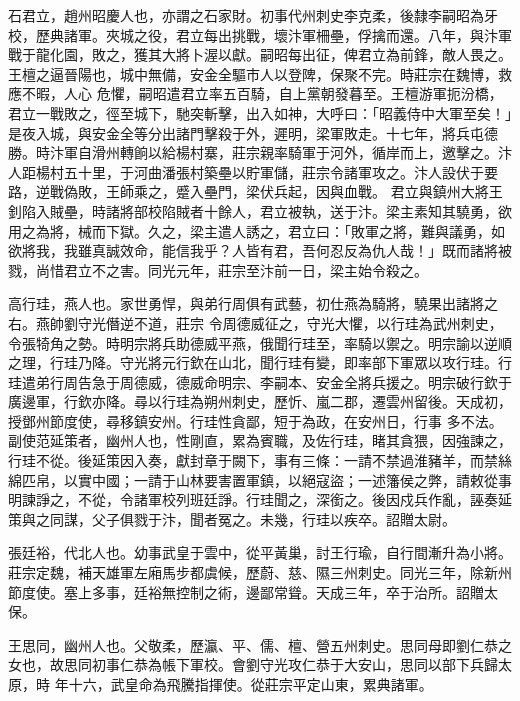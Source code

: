 \begin{pinyinscope}
 石君立，趙州昭慶人也，亦謂之石家財。初事代州刺史李克柔，後隸李嗣昭為牙校，歷典諸軍。夾城之役，君立每出挑戰，壞汴軍柵壘，俘擒而還。八年，與汴軍戰于龍化園，敗之，獲其大將卜渥以獻。嗣昭每出征，俾君立為前鋒，敵人畏之。王檀之逼晉陽也，城中無備，安金全驅市人以登陴，保聚不完。時莊宗在魏博，救應不暇，人心
 危懼，嗣昭遣君立率五百騎，自上黨朝發暮至。王檀游軍扼汾橋，君立一戰敗之，徑至城下，馳突斬擊，出入如神，大呼曰：「昭義侍中大軍至矣！」是夜入城，與安金全等分出諸門擊殺于外，遲明，梁軍敗走。十七年，將兵屯德勝。時汴軍自滑州轉餉以給楊村寨，莊宗親率騎軍于河外，循岸而上，邀擊之。汴人距楊村五十里，于河曲潘張村築壘以貯軍儲，莊宗令諸軍攻之。汴人設伏于要路，逆戰偽敗，王師乘之，蹙入壘門，梁伏兵起，因與血戰。
 君立與鎮州大將王釗陷入賊壘，時諸將部校陷賊者十餘人，君立被執，送于汴。梁主素知其驍勇，欲用之為將，械而下獄。久之，梁主遣人誘之，君立曰：「敗軍之將，難與議勇，如欲將我，我雖真誠效命，能信我乎？人皆有君，吾何忍反為仇人哉！」既而諸將被戮，尚惜君立不之害。同光元年，莊宗至汴前一日，梁主始令殺之。



 高行珪，燕人也。家世勇悍，與弟行周俱有武藝，初仕燕為騎將，驍果出諸將之右。燕帥劉守光僭逆不道，莊宗
 令周德威征之，守光大懼，以行珪為武州刺史，令張犄角之勢。時明宗將兵助德威平燕，俄聞行珪至，率騎以禦之。明宗諭以逆順之理，行珪乃降。守光將元行欽在山北，聞行珪有變，即率部下軍眾以攻行珪。行珪遣弟行周告急于周德威，德威命明宗、李嗣本、安金全將兵援之。明宗破行欽于廣邊軍，行欽亦降。尋以行珪為朔州刺史，歷忻、嵐二郡，遷雲州留後。天成初，授鄧州節度使，尋移鎮安州。行珪性貪鄙，短于為政，在安州日，行事
 多不法。副使范延策者，幽州人也，性剛直，累為賓職，及佐行珪，睹其貪猥，因強諫之，行珪不從。後延策因入奏，獻封章于闕下，事有三條：一請不禁過淮豬羊，而禁絲綿匹帛，以實中國；一請于山林要害置軍鎮，以絕寇盜；一述籓侯之弊，請敕從事明諫諍之，不從，令諸軍校列班廷諍。行珪聞之，深銜之。後因戍兵作亂，誣奏延策與之同謀，父子俱戮于汴，聞者冤之。未幾，行珪以疾卒。詔贈太尉。



 張廷裕，代北人也。幼事武皇于雲中，從平黃巢，討王行瑜，自行間漸升為小將。莊宗定魏，補天雄軍左廂馬步都虞候，歷蔚、慈、隰三州刺史。同光三年，除新州節度使。塞上多事，廷裕無控制之術，邊鄙常聳。天成三年，卒于治所。詔贈太保。



 王思同，幽州人也。父敬柔，歷瀛、平、儒、檀、營五州刺史。思同母即劉仁恭之女也，故思同初事仁恭為帳下軍校。會劉守光攻仁恭于大安山，思同以部下兵歸太原，時
 年十六，武皇命為飛騰指揮使。從莊宗平定山東，累典諸軍。




\end{pinyinscope}
